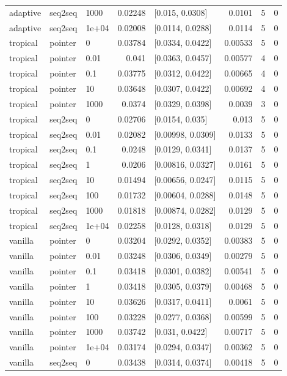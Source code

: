 \documentclass[10pt]{article}
\begin{document}
{\begin{longtable}{lllrlrrr}
adaptive & seq2seq & 1000 & 0.02248 & [0.015, 0.0308] & 0.0101 & 5 & 0\\
adaptive & seq2seq & 1e+04 & 0.02008 & [0.0114, 0.0288] & 0.0114 & 5 & 0\\
tropical & pointer & 0 & 0.03784 & [0.0334, 0.0422] & 0.00533 & 5 & 0\\
tropical & pointer & 0.01 & 0.041 & [0.0363, 0.0457] & 0.00577 & 4 & 0\\
tropical & pointer & 0.1 & 0.03775 & [0.0312, 0.0422] & 0.00665 & 4 & 0\\
tropical & pointer & 10 & 0.03648 & [0.0307, 0.0422] & 0.00692 & 4 & 0\\
tropical & pointer & 1000 & 0.0374 & [0.0329, 0.0398] & 0.0039 & 3 & 0\\
tropical & seq2seq & 0 & 0.02706 & [0.0154, 0.035] & 0.013 & 5 & 0\\
tropical & seq2seq & 0.01 & 0.02082 & [0.00998, 0.0309] & 0.0133 & 5 & 0\\
tropical & seq2seq & 0.1 & 0.0248 & [0.0129, 0.0341] & 0.0137 & 5 & 0\\
tropical & seq2seq & 1 & 0.0206 & [0.00816, 0.0327] & 0.0161 & 5 & 0\\
tropical & seq2seq & 10 & 0.01494 & [0.00656, 0.0247] & 0.0115 & 5 & 0\\
tropical & seq2seq & 100 & 0.01732 & [0.00604, 0.0288] & 0.0148 & 5 & 0\\
tropical & seq2seq & 1000 & 0.01818 & [0.00874, 0.0282] & 0.0129 & 5 & 0\\
tropical & seq2seq & 1e+04 & 0.02258 & [0.0128, 0.0318] & 0.0129 & 5 & 0\\
vanilla & pointer & 0 & 0.03204 & [0.0292, 0.0352] & 0.00383 & 5 & 0\\
vanilla & pointer & 0.01 & 0.03248 & [0.0306, 0.0349] & 0.00279 & 5 & 0\\
vanilla & pointer & 0.1 & 0.03418 & [0.0301, 0.0382] & 0.00541 & 5 & 0\\
vanilla & pointer & 1 & 0.03418 & [0.0305, 0.0379] & 0.00468 & 5 & 0\\
vanilla & pointer & 10 & 0.03626 & [0.0317, 0.0411] & 0.0061 & 5 & 0\\
vanilla & pointer & 100 & 0.03228 & [0.0277, 0.0368] & 0.00599 & 5 & 0\\
vanilla & pointer & 1000 & 0.03742 & [0.031, 0.0422] & 0.00717 & 5 & 0\\
vanilla & pointer & 1e+04 & 0.03174 & [0.0294, 0.0347] & 0.00362 & 5 & 0\\
vanilla & seq2seq & 0 & 0.03438 & [0.0314, 0.0374] & 0.00418 & 5 & 0\\

\end{longtable}}
\end{document}
